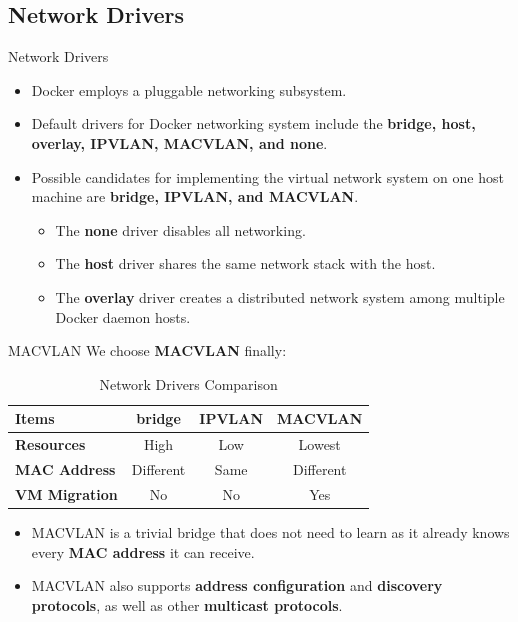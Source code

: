 \documentclass{beamer}
\begin{document}
\subsection{Network Drivers}
\begin{frame}{Network Drivers}
\begin{itemize}
\item Docker employs a pluggable networking subsystem.
\item Default drivers for Docker networking system include the \textbf{bridge, host, overlay, IPVLAN, MACVLAN, and none}.
\item Possible candidates for implementing the virtual network system on one host machine are \textbf{bridge, IPVLAN, and MACVLAN}.
\begin{itemize}
    \item The \textbf{none} driver disables all networking.
    \item The \textbf{host} driver shares the same network stack with the host.
    \item The \textbf{overlay} driver creates a distributed network system among multiple Docker daemon hosts.
\end{itemize}
\end{itemize}
\end{frame}

\begin{frame}{MACVLAN}
We choose \textbf{MACVLAN} finally:
\begin{table}[t!]
  \begin{center}
    \caption{Network Drivers Comparison}
    \begin{tabular}{|l|c|c|c|}
    \hline
    \textbf{Items} & \textbf{bridge} & \textbf{IPVLAN} & \textbf{MACVLAN} \\
    \hline
    \textbf{Resources} & High & Low & Lowest \\
    \hline
    \textbf{MAC Address} & Different & Same & Different \\
    \hline
    \textbf{VM Migration} & No & No & Yes \\
    \hline
    \end{tabular}
    \label{tab:comparedrivers}
  \end{center}
\end{table}
\begin{itemize}
 \item MACVLAN is a trivial bridge that does not need to learn as it already knows every \textbf{MAC address} it can receive.
\item MACVLAN also supports \textbf{address configuration} and \textbf{discovery protocols}, as well as other \textbf{multicast protocols}.
\end{itemize}
\end{frame}
\end{document}
